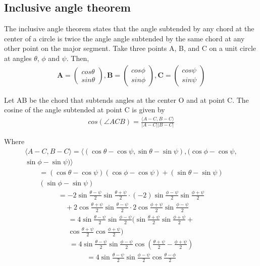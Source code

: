\documentclass[journal,10pt,twocolumn]{article}
\let\vec\mathbf
\newcommand{\myvec}[1]{\ensuremath{\begin{pmatrix}#1\end{pmatrix}}}
\begin{document}
{\subsection*{\normalsize Inclusive angle theorem}
The inclusive angle theorem states that the angle subtended by any chord at the center of a circle is twice the angle angle subtended by the same chord at any other point on the major segment. Take three points A, B, and C on a unit circle at angles $\theta$, $\phi$ and $\psi$. Then,
\begin{eqnarray}
	\vec{A} = \myvec{cos\theta\\sin\theta},
	\vec{B} = \myvec{cos\phi\\sin\phi},
	\vec{C} = \myvec{cos\psi\\sin\psi}
\end{eqnarray}

Let AB be the chord that subtends angles at the center O and at point C. The cosine of the angle subtended at point C is given by
\begin{align}
	cos(\angle ACB) = \frac{\langle A-C, B-C\rangle}{|A-C||B-C|}
	\label{pf2-eq-1}
\end{align}

Where
\begin{multline*}
	\langle A-C, B-C\rangle = \langle (\cos\theta-\cos\psi,\sin\theta-\sin\psi),(\cos\phi-\cos\psi,\\
	\sin\phi-\sin\psi)\rangle
	\end{multline*}
\begin{multline*}
	= (\cos\theta-\cos\psi)(\cos\phi-\cos\psi)+(\sin\theta-\sin\psi)\\
	(\sin\phi-\sin\psi)
\end{multline*}
\begin{multline*}
	= -2\sin\frac{\theta-\psi}2\sin\frac{\theta+\psi}2 \cdot(-2)\sin\frac{\phi-\psi}2\sin\frac{\phi+\psi}2 \\\quad+ 2\cos\frac{\theta+\psi}2\sin\frac{\theta-\psi}2 \cdot 2\cos\frac{\phi+\psi}2\sin\frac{\phi-\psi}2
\end{multline*}
\begin{multline*}
	= 4\sin\frac{\theta-\psi}2\sin\frac{\phi-\psi}2(\sin\frac{\theta+\psi}2\sin\frac{\phi+\psi}2+\\
	\cos\frac{\theta+\psi}2\cos\frac{\phi+\psi}2)
\end{multline*}
\begin{align*}
	= 4\sin\frac{\theta-\psi}2\sin\frac{\phi-\psi}2\cos\left(\frac{\theta+\psi}2-\frac{\phi+\psi}2\right)
\end{align*}
\begin{align}
	= 4\sin\frac{\theta-\psi}2\sin\frac{\phi-\psi}2\cos\frac{\theta-\phi}2
	\label{pf2-eq-2}
\end{align}

}
\end{document}
